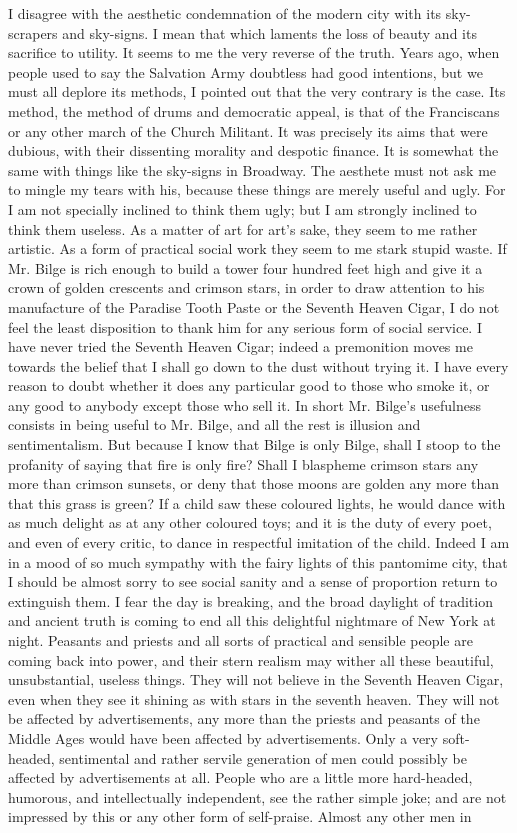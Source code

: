 \documentclass{book}
\begin{document}
I disagree with the aesthetic condemnation of the modern city with its sky-scrapers and sky-signs. I mean that which laments the loss of beauty and its sacrifice to utility. It seems to me the very reverse of the truth. Years ago, when people used to say the Salvation Army doubtless had good intentions, but we must all deplore its methods, I pointed out that the very contrary is the case. Its method, the method of drums and democratic appeal, is that of the Franciscans or any other march of the Church Militant. It was precisely its aims that were dubious, with their dissenting morality and despotic finance. It is somewhat the same with things like the sky-signs in Broadway. The aesthete must not ask me to mingle my tears with his, because these things are merely useful and ugly. For I am not specially inclined to think them ugly; but I am strongly inclined to think them useless. As a matter of art for art’s sake, they seem to me rather artistic. As a form of practical social work they seem to me stark stupid waste. If Mr. Bilge is rich enough to build a tower four hundred feet high and give it a crown of golden crescents and crimson stars, in order to draw attention to his manufacture of the Paradise Tooth Paste or the Seventh Heaven Cigar, I do not feel the least disposition to thank him for any serious form of social service. I have never tried the Seventh Heaven Cigar; indeed a premonition moves me towards the belief that I shall go down to the dust without trying it. I have every reason to doubt whether it does any particular good to those who smoke it, or any good to anybody except those who sell it. In short Mr. Bilge’s usefulness consists in being useful to Mr. Bilge, and all the rest is illusion and sentimentalism. But because I know that Bilge is only Bilge, shall I stoop to the profanity of saying that fire is only fire? Shall I blaspheme crimson stars any more than crimson sunsets, or deny that those moons are golden any more than that this grass is green? If a child saw these coloured lights, he would dance with as much delight as at any other coloured toys; and it is the duty of every poet, and even of every critic, to dance in respectful imitation of the child. Indeed I am in a mood of so much sympathy with the fairy lights of this pantomime city, that I should be almost sorry to see social sanity and a sense of proportion return to extinguish them. I fear the day is breaking, and the broad daylight of tradition and ancient truth is coming to end all this delightful nightmare of New York at night. Peasants and priests and all sorts of practical and sensible people are coming back into power, and their stern realism may wither all these beautiful, unsubstantial, useless things. They will not believe in the Seventh Heaven Cigar, even when they see it shining as with stars in the seventh heaven. They will not be affected by advertisements, any more than the priests and peasants of the Middle Ages would have been affected by advertisements. Only a very soft-headed, sentimental and rather servile generation of men could possibly be affected by advertisements at all. People who are a little more hard-headed, humorous, and intellectually independent, see the rather simple joke; and are not impressed by this or any other form of self-praise. Almost any other men in 
\end{document}
